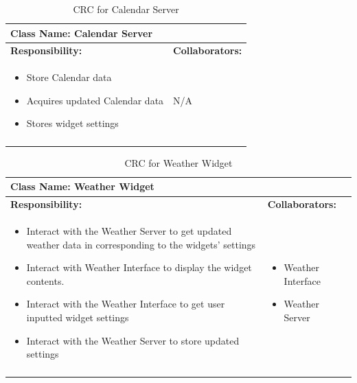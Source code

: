 \documentclass[]{article}
\begin{document}
\begin{longtable}{| p{} | p{} |}
	\hline
	\multicolumn{2}{|l|}{\textbf{Class Name: Calendar Server}} \\
	\hline
	\textbf{Responsibility:} & \textbf{Collaborators:} \\
	\hline
	\begin{itemize}
		\item Store Calendar data
		\item Acquires updated Calendar data
		\item Stores widget settings
    \end{itemize} & \newline \newline  N/A \\
	\hline
	\caption{CRC for Calendar Server}
\end{longtable}
\newpage
\begin{longtable}{| p{} | p{} |}
	\hline
	\multicolumn{2}{|l|}{\textbf{Class Name: Weather Widget}} \\
	\hline
	\textbf{Responsibility:} & \textbf{Collaborators:} \\
	\hline
	\begin{itemize}
		\item Interact with the Weather Server to get updated weather data in corresponding to the widgets' settings
		\item Interact with Weather Interface to display the widget contents.
		\item Interact with the Weather Interface to get user inputted widget settings
		\item Interact with the Weather Server to store updated settings 
    \end{itemize} & 
	\begin{itemize}
		\item Weather Interface
        \item Weather Server 
	\end{itemize} \\
	\hline
	\caption{CRC for Weather Widget}
\end{longtable}
\end{document}
